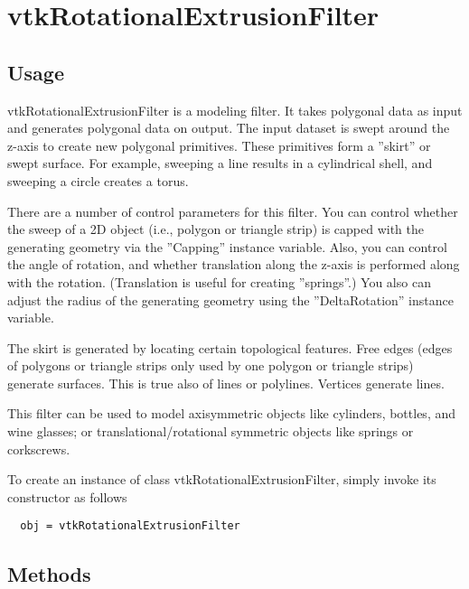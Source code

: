 \section{vtkRotationalExtrusionFilter}

\subsection{Usage}

 vtkRotationalExtrusionFilter is a modeling filter. It takes polygonal 
 data as input and generates polygonal data on output. The input dataset 
 is swept around the z-axis to create new polygonal primitives. These 
 primitives form a ''skirt'' or swept surface. For example, sweeping a
 line results in a cylindrical shell, and sweeping a circle creates a 
 torus.

 There are a number of control parameters for this filter. You can 
 control whether the sweep of a 2D object (i.e., polygon or triangle 
 strip) is capped with the generating geometry via the ''Capping'' instance
 variable. Also, you can control the angle of rotation, and whether 
 translation along the z-axis is performed along with the rotation.
 (Translation is useful for creating ''springs''.) You also can adjust 
 the radius of the generating geometry using the ''DeltaRotation'' instance 
 variable.

 The skirt is generated by locating certain topological features. Free 
 edges (edges of polygons or triangle strips only used by one polygon or
 triangle strips) generate surfaces. This is true also of lines or 
 polylines. Vertices generate lines.

 This filter can be used to model axisymmetric objects like cylinders,
 bottles, and wine glasses; or translational/rotational symmetric objects
 like springs or corkscrews.

To create an instance of class vtkRotationalExtrusionFilter, simply
invoke its constructor as follows
\begin{verbatim}
  obj = vtkRotationalExtrusionFilter
\end{verbatim}
\subsection{Methods}

